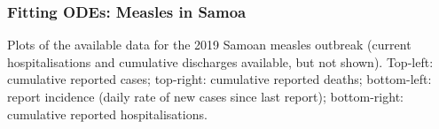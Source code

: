 \documentclass[aspectratio=169]{beamer}
\newcommand{\norm}[2][2]{\left\lVert #2 \right\rVert_{#1}}
\begin{document}






\begin{frame}
  \frametitle{Fitting ODEs: Measles in Samoa}
\centering
  \vspace{0.25em}

  \vspace{-0.25em}
  {\tiny \linespread{0}Plots of the available data for the 2019 Samoan measles outbreak (current hospitalisations and cumulative discharges available, but not shown). Top-left: cumulative reported cases; top-right: cumulative reported deaths; bottom-left: report incidence (daily rate of new cases since last report); bottom-right: cumulative reported hospitalisations.\\}

\end{frame}



\end{document}
